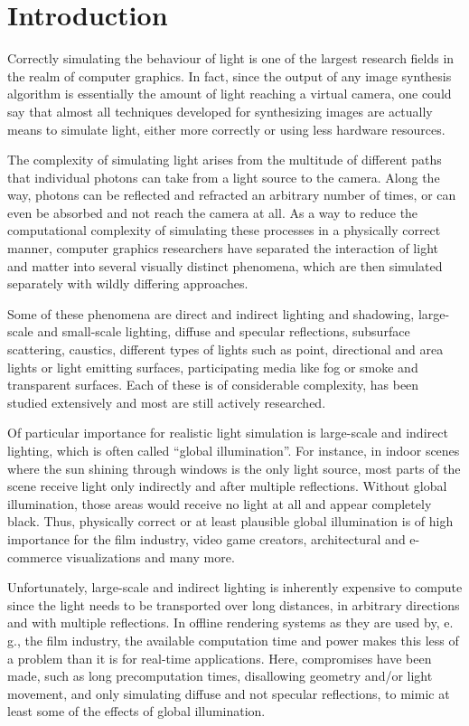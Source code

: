 
\chapter{Introduction}
\label{chap:introduction}

Correctly simulating the behaviour of light is one of the largest research fields in the realm of computer graphics. In fact, since the output of any image synthesis algorithm is essentially the amount of light reaching a virtual camera, one could say that almost all techniques developed for synthesizing images are actually means to simulate light, either more correctly or using less hardware resources.

The complexity of simulating light arises from the multitude of different paths that individual photons can take from a light source to the camera. Along the way, photons can be reflected and refracted an arbitrary number of times, or can even be absorbed and not reach the camera at all. As a way to reduce the computational complexity of simulating these processes in a physically correct manner, computer graphics researchers have separated the interaction of light and matter into several visually distinct phenomena, which are then simulated separately with wildly differing approaches.

Some of these phenomena are direct and indirect lighting and shadowing, large-scale and small-scale lighting, diffuse and specular reflections, subsurface scattering, caustics, different types of lights such as point, directional and area lights or light emitting surfaces, participating media like fog or smoke and transparent surfaces. Each of these is of considerable complexity, has been studied extensively and most are still actively researched.

Of particular importance for realistic light simulation is large-scale and indirect lighting, which is often called ``global illumination''. For instance, in indoor scenes where the sun shining through windows is the only light source, most parts of the scene receive light only indirectly and after multiple reflections. Without global illumination, those areas would receive no light at all and appear completely black. Thus, physically correct or at least plausible global illumination is of high importance for the film industry, video game creators, architectural and e-commerce visualizations and many more.

Unfortunately, large-scale and indirect lighting is inherently expensive to compute since the light needs to be transported over long distances, in arbitrary directions and with multiple reflections. In offline rendering systems as they are used by, e.\,g., the film industry, the available computation time and power makes this less of a problem than it is for real-time applications. Here, compromises have been made, such as long precomputation times, disallowing geometry and/or light movement, and only simulating diffuse and not specular reflections, to mimic at least some of the effects of global illumination.

